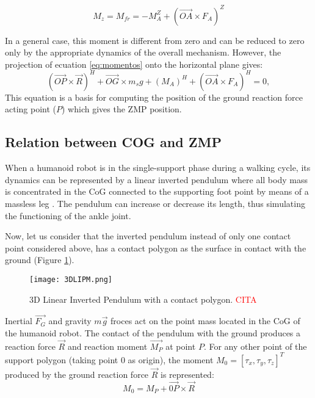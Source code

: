 \begin{equation}
M_z = M_{fr} = -M_A^Z + (\overrightarrow{OA} \times F_A)^Z
\end{equation}

In a general case, this moment is different from zero and can be reduced to zero only by the appropriate dynamics of the overall mechanism. However, the projection of ecuation \eqref{eq:momentos} onto the horizontal plane gives:
\begin{equation}
(\overrightarrow{OP} \times \overrightarrow{R})^H + \overrightarrow{OG} \times m_sg + (M_A)^H + (\overrightarrow{OA} \times F_A)^H = 0,
\label{eq:momentos}
\end{equation}
This equation is a basis for computing the position of the ground reaction force acting point ($P$) which gives the ZMP position.


\subsection{Relation between COG and ZMP}
When a humanoid robot is in the single-support phase during a walking cycle, its dynamics can be represented by a linear inverted pendulum where all body mass is concentrated in the CoG connected to the supporting foot point by means of a massless leg \cite{Kaj2001}. The pendulum can increase or decrease its length, thus simulating the functioning of the ankle joint.

Now, let us consider that the inverted pendulum instead of only one contact point considered above, has a contact polygon as the surface in contact with the ground (Figure \ref{fig:3DLIPM}).

\begin{figure}[!hbt]
\centering
\texttt{[image: 3DLIPM.png]}
\caption{3D Linear Inverted Pendulum with a contact polygon. \textcolor{red}{CITA}}
\label{fig:3DLIPM}
\end{figure}

Inertial $\overrightarrow{F_G}$ and gravity $m\overrightarrow{g}$ froces act on the point mass located in the CoG of the humanoid robot. The contact of the pendulum with the ground produces a reaction force $\overrightarrow{R}$ and reaction moment $\overrightarrow{M_P}$ at point $P$. For any other point of the support polygon (taking point 0 as origin), the moment $M_0=[\tau_x, \tau_y, \tau_z]^T$ produced by the ground reaction force $\overrightarrow{R}$ is represented: 
\begin{equation}
M_0 = M_P + \overrightarrow{0P} \times \overrightarrow{R}
\label{eq:M0}
\end{equation}

